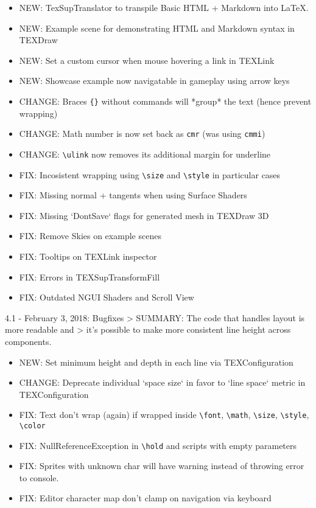 \documentclass[12pt]{article}
\begin{document}
\begin{itemize}
\item NEW: TexSupTranslator to transpile Basic HTML + Markdown into LaTeX.
\item NEW: Example scene for demonstrating HTML and Markdown syntax in TEXDraw
\item NEW: Set a custom cursor when mouse hovering a link in TEXLink
\item NEW: Showcase example now navigatable in gameplay using arrow keys
\item CHANGE: Braces \verb|{}| without commands will *group* the text (hence prevent wrapping)
\item CHANGE: Math number is now set back as \verb|cmr| (was using \verb|cmmi|)
\item CHANGE: \verb|\ulink| now removes its additional margin for underline
\item FIX: Incosistent wrapping using \verb|\size| and \verb|\style| in particular cases
\item FIX: Missing normal + tangents when using Surface Shaders
\item FIX: Missing `DontSave` flags for generated mesh in TEXDraw 3D
\item FIX: Remove Skies on example scenes
\item FIX: Tooltips on TEXLink inspector
\item FIX: Errors in TEXSupTransformFill
\item FIX: Outdated NGUI Shaders and Scroll View
\end{itemize}

4.1 - February 3, 2018: Bugfixes
> SUMMARY: The code that handles layout is more readable and
> it's possible to make more consistent line height across components.

\begin{itemize}
\item NEW: Set minimum height and depth in each line via TEXConfiguration
\item CHANGE: Deprecate individual `space size` in favor to `line space` metric in TEXConfiguration
\item FIX: Text don't wrap (again) if wrapped inside \verb|\font|, \verb|\math|, \verb|\size|, \verb|\style|, \verb|\color|
\item FIX: NullReferenceException in \verb|\hold| and scripts with empty parameters
\item FIX: Sprites with unknown char will have warning instead of throwing error to console.
\item FIX: Editor character map don't clamp on navigation via keyboard
\end{itemize}
\end{document}
